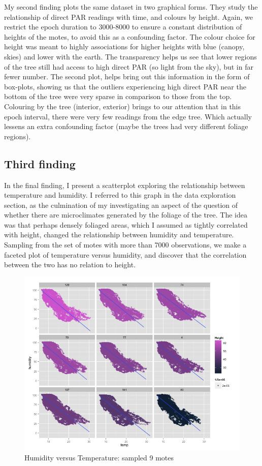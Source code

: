 \documentclass[english]{article}\usepackage[]{graphicx}\usepackage[]{color}
\begin{document}
My second finding plots the same dataset in two graphical forms.  They study the relationship of direct PAR readings with time, and colours by height.  Again, we restrict the epoch duration to 3000-8000 to ensure a constant distribution of heights of the motes, to avoid this as a confounding factor.  The colour choice for height was meant to highly associations for higher heights with blue (canopy, skies) and lower with the earth.  The transparency helps us see that lower regions of the tree still had access to high direct PAR (so light from the sky), but in far fewer number.  The second plot, helps bring out this information in the form of box-plots, showing us that the outliers experiencing high direct PAR near the bottom of the tree were very sparse in comparison to those from the top.  Colouring by the tree (interior, exterior) brings to our attention that in this epoch interval, there were very few readings from the edge tree.  Which actually lessens an extra confounding factor (maybe the trees had very different foliage regions). 


\subsection{Third finding}
In the final finding, I present a scatterplot exploring the relationship between temperature and humidity.  I referred to this graph in the data exploration section, as the culmination of my investigating an aspect of the question of whether there are microclimates generated by the foliage of the tree.  The idea was that perhaps densely foliaged areas, which I assumed as tightly correlated with height, changed the relationship between humidity and temperature.  Sampling from the set of motes with more than 7000 observations, we make a faceted plot of temperature versus humidity, and discover that the correlation between the two has no relation to height.  
\begin{figure}[H]
\centering
\includegraphics[width=\textwidth]{humidtemp7000}
\caption{Humidity versus Temperature: sampled 9 motes}

\end{figure}
\end{document}
